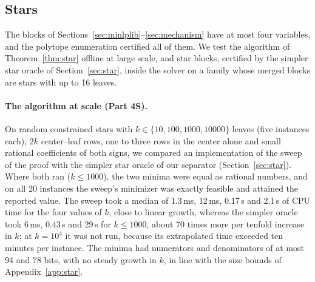 \subsection{Stars}\label{sec:star-bench}

The blocks of Sections~\ref{sec:minlplib}--\ref{sec:mechanism} have at most four
variables, and the polytope enumeration certified all of them. We test the
algorithm of Theorem~\ref{thm:star} offline at large scale, and star blocks,
certified by the simpler star oracle of Section~\ref{sec:star}, inside the
solver on a family whose merged blocks are stars with up to 16 leaves.

\paragraph{The algorithm at scale (Part 4S).} On random constrained stars with
$k\in\{10,100,1000,10000\}$ leaves (five instances each), $2k$ center--leaf
rows, one to three rows in the center alone and small rational coefficients of
both signs, we compared an implementation of the sweep of the proof with the
simpler star oracle of our separator (Section~\ref{sec:star}). Where both ran
($k\le1000$), the two minima were equal as rational numbers, and on all 20
instances the sweep's minimizer was exactly feasible and attained the reported
value. The sweep took a median of 1.3\,ms, 12\,ms, 0.17\,s and 2.1\,s of CPU time
for the four values of $k$, close to linear growth, whereas the simpler oracle
took 6\,ms, 0.43\,s and 29\,s for $k\le1000$, about 70 times more per tenfold
increase in $k$; at $k=10^4$ it was not run, because its extrapolated time
exceeded ten minutes per instance. The minima had numerators and denominators
of at most 94 and 78 bits, with no steady growth in $k$, in line with the size
bounds of Appendix~\ref{app:star}.

